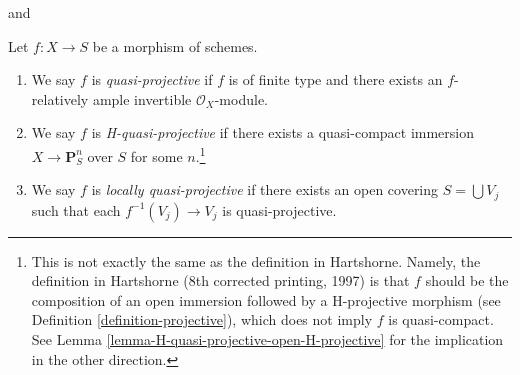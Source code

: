\begin{definition}
\label{definition-quasi-projective}
\begin{reference}
\cite[II, Definition 5.3.1]{EGA} and \cite[page 103]{H}
\end{reference}
Let $f : X \to S$ be a morphism of schemes.
\begin{enumerate}
\item We say $f$ is {\it quasi-projective} if $f$ is of finite type
and there exists an $f$-relatively ample invertible $\mathcal{O}_X$-module.
\item We say $f$ is {\it H-quasi-projective} if there exists
a quasi-compact immersion $X \to \mathbf{P}^n_S$ over $S$ for some
$n$.\footnote{This is not exactly the same as the definition in Hartshorne.
Namely, the definition in Hartshorne (8th corrected printing, 1997) is that
$f$ should be the composition of an open immersion followed by a H-projective
morphism (see Definition \ref{definition-projective}), which does not imply
$f$ is quasi-compact. See
Lemma \ref{lemma-H-quasi-projective-open-H-projective} for
the implication in the other direction.}
\item We say $f$ is {\it locally quasi-projective} if there exists
an open covering $S = \bigcup V_j$ such that each $f^{-1}(V_j) \to V_j$
is quasi-projective.
\end{enumerate}
\end{definition}